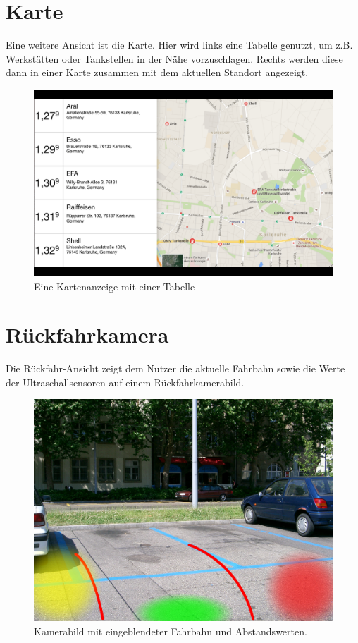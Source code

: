 \documentclass[pflichtenheft.tex]{subfiles}
\begin{document}
\clearpage
\section{Karte}
\label{sec:Karte}

Eine weitere Ansicht ist die Karte. Hier wird links eine Tabelle genutzt, um z.B. Werkstätten oder Tankstellen in der Nähe vorzuschlagen. Rechts werden diese dann in einer Karte zusammen mit dem aktuellen Standort angezeigt.

\begin{figure}[H]
  	\begin{center}
 		\includegraphics[width=\textwidth]{Images/GUI-Map.png}
  		\caption{Eine Kartenanzeige mit einer Tabelle}
  	\end{center}
\end{figure}

\clearpage
\section{Rückfahrkamera}

Die Rückfahr-Ansicht zeigt dem Nutzer die aktuelle Fahrbahn sowie die Werte der Ultraschallsensoren auf einem Rückfahrkamerabild.

\begin{figure}[H]
  	\begin{center}
 		\includegraphics[width=\textwidth]{Images/GUI-BackDrive.jpg}
  		\caption{Kamerabild mit eingeblendeter Fahrbahn und Abstandswerten.}
  	\end{center}
\end{figure}
\end{document}
